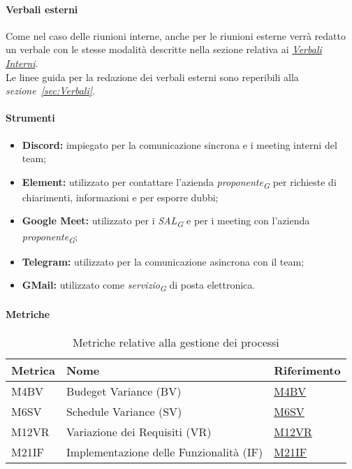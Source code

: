 \paragraph*{Verbali esterni}
Come nel caso delle riunioni interne, anche per le riunioni esterne verrà redatto un verbale con le stesse modalità descritte nella sezione relativa ai \hyperlink{par:verbaliInterni}{\textit{Verbali Interni}}. \\
Le linee guida per la redazione dei verbali esterni sono reperibili alla \textit{sezione~\ref{sec:Verbali}}.

\paragraph{Strumenti}
\begin{itemize}
  \item \textbf{Discord:} impiegato per la comunicazione sincrona e i meeting interni del team;
  \item \textbf{Element:} utilizzato per contattare l'azienda \textit{proponente}\textsubscript{\textit{G}} per richieste di chiarimenti, informazioni e per esporre dubbi;
  \item \textbf{Google Meet:} utilizzato per i \textit{SAL}\textsubscript{\textit{G}} e per i meeting con l'azienda \textit{proponente}\textsubscript{\textit{G}};
  \item \textbf{Telegram:} utilizzato per la comunicazione asincrona con il team;
  \item \textbf{GMail:} utilizzato come \textit{servizio}\textsubscript{\textit{G}} di posta elettronica.
\end{itemize}
\vspace{0.1cm}

\paragraph{Metriche}
\begin{table}[H]
  \centering
  \begin{tabular}{|C{3cm}|C{3cm}|C{4cm}|}
  \hline
  Metrica & Nome & Riferimento \\
  \hline \hline
  M4BV & Budeget Variance (BV) &  \hyperlink{item:M4BV}{M4BV} \\
  M6SV & Schedule Variance (SV) &  \hyperlink{item:M6SV}{M6SV} \\
  M12VR & Variazione dei Requisiti (VR) &  \hyperlink{item:M12VR}{M12VR} \\
  M21IF & Implementazione delle Funzionalità (IF) & \hyperlink{item:M21IF}{M21IF} \\ 
  \hline
  \end{tabular}
  \caption{Metriche relative alla gestione dei processi}
\end{table}
